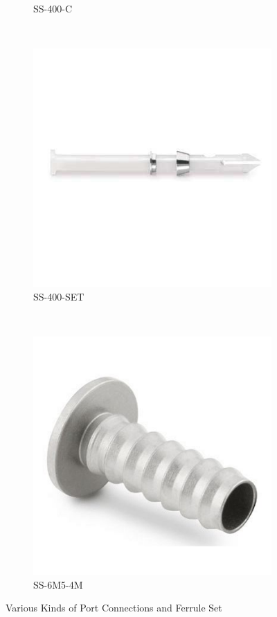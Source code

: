 \begin{figure}[H]
\begin{subfigure}[b]{0.21\textwidth}
    \caption{SS-400-C}
    \end{subfigure}
    ~
    \begin{subfigure}[b]{0.21\textwidth}
    \centering
    \includegraphics[width=\textwidth]{appendix/img/interfaces/SS-400-SET.jpg}
    \caption{SS-400-SET}
    \end{subfigure}
    ~
    \begin{subfigure}[b]{0.21\textwidth}
    \centering
    \includegraphics[width=\textwidth]{appendix/img/interfaces/SS-6M5-4M.jpg}
    \caption{SS-6M5-4M}
    \end{subfigure}
    \caption{Various Kinds of Port Connections and Ferrule Set}
    \label{Appx:Other_fittings}
\end{figure}

